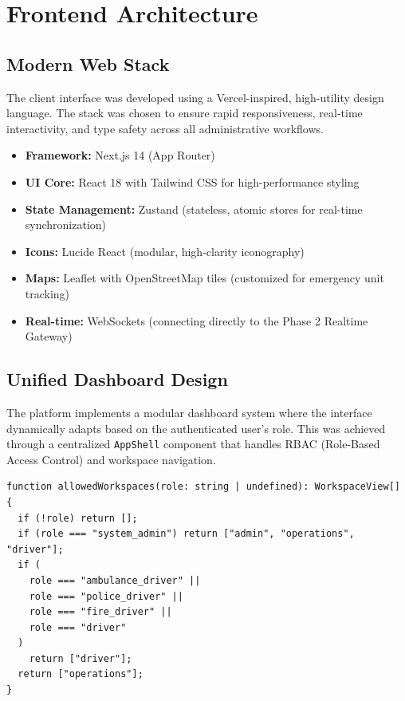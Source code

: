 \documentclass[12pt,a4paper]{report}
\begin{document}
\chapter{Frontend Architecture}

\section{Modern Web Stack}

The client interface was developed using a Vercel-inspired, high-utility design language. The stack was chosen to ensure rapid responsiveness, real-time interactivity, and type safety across all administrative workflows.

\begin{itemize}
	\item \textbf{Framework:} Next.js 14 (App Router)
	\item \textbf{UI Core:} React 18 with Tailwind CSS for high-performance styling
	\item \textbf{State Management:} Zustand (stateless, atomic stores for real-time synchronization)
	\item \textbf{Icons:} Lucide React (modular, high-clarity iconography)
	\item \textbf{Maps:} Leaflet with OpenStreetMap tiles (customized for emergency unit tracking)
	\item \textbf{Real-time:} WebSockets (connecting directly to the Phase 2 Realtime Gateway)
\end{itemize}

\section{Unified Dashboard Design}

The platform implements a modular dashboard system where the interface dynamically adapts based on the authenticated user's role. This was achieved through a centralized \texttt{AppShell} component that handles RBAC (Role-Based Access Control) and workspace navigation.

\begin{lstlisting}[language=tsx, caption=Role-Based Workspace Selection (AppShell.tsx)]
function allowedWorkspaces(role: string | undefined): WorkspaceView[] {
  if (!role) return [];
  if (role === "system_admin") return ["admin", "operations", "driver"];
  if (
    role === "ambulance_driver" ||
    role === "police_driver" ||
    role === "fire_driver" ||
    role === "driver"
  )
    return ["driver"];
  return ["operations"];
}
\end{lstlisting}
\end{document}
